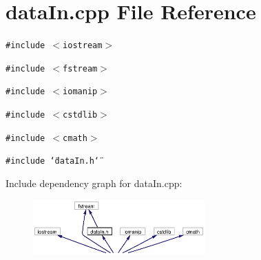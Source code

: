 \section{data\-In.cpp File Reference}
\label{dataIn_8cpp}
{\tt \#include $<$iostream$>$}\par
{\tt \#include $<$fstream$>$}\par
{\tt \#include $<$iomanip$>$}\par
{\tt \#include $<$cstdlib$>$}\par
{\tt \#include $<$cmath$>$}\par
{\tt \#include \char`\"{}data\-In.h\char`\"{}}\par


Include dependency graph for data\-In.cpp:\begin{figure}[H]
\begin{center}
\leavevmode
\includegraphics[width=187pt]{dataIn_8cpp__incl}
\end{center}
\end{figure}
